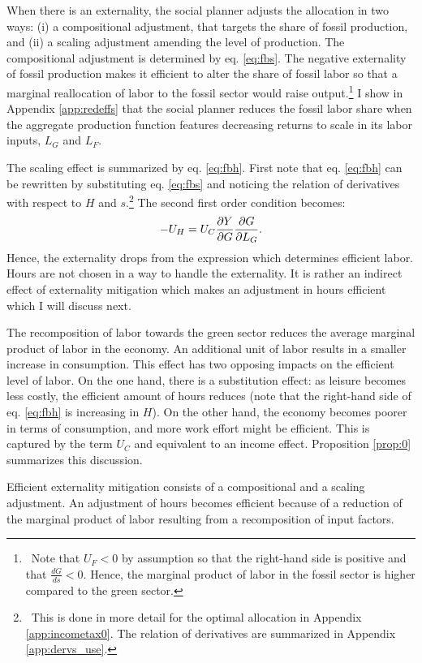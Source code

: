 When there is an externality, the social planner adjusts the allocation in two ways: (i) a compositional adjustment, that targets the share of fossil production, and (ii) a scaling adjustment amending the level of production. 
The compositional adjustment is determined by eq. \eqref{eq:fbs}.
The negative externality of fossil production makes it efficient to alter the share of fossil labor so that  a marginal reallocation of labor to the fossil sector would raise output.\footnote{\ Note that $U_F<0$ by assumption so that the right-hand side is positive and that $\frac{dG}{ds}<0$. Hence, the marginal product of labor in the fossil sector is higher compared to the green sector.} %
I show in Appendix \ref{app:redeffs} that the social planner reduces the fossil labor share when the aggregate production function features decreasing returns to scale in its labor inputs, $L_G$ and $L_F$.


The scaling effect is summarized by eq. \eqref{eq:fbh}.
First note that eq. \eqref{eq:fbh} can be rewritten by substituting eq. \eqref{eq:fbs} and noticing the relation of derivatives with respect to $H$ and $s$.\footnote{\ This is done in more detail for the optimal allocation in Appendix \ref{app:incometax0}. The relation of derivatives are summarized in Appendix \ref{app:dervs_use}.}  
The second first order condition becomes:
\begin{align}\label{eq:fbh_simp}
-U_H=U_C\frac{\partial Y}{\partial G}\frac{\partial{G}}{\partial{L_G}}.
\end{align}
Hence, the externality drops from the expression which determines efficient labor. Hours are not chosen in a way to handle the externality. It is rather an indirect effect of externality mitigation which makes an adjustment in hours efficient which I will discuss next.

The recomposition of labor towards the  green sector reduces the average marginal product of labor in the economy. An additional unit of labor results in a smaller increase in consumption.  This effect has two opposing impacts on the efficient level of labor. On the one hand, there is a substitution effect: as leisure becomes less costly, the efficient amount of hours reduces (note that the right-hand side of eq. \eqref{eq:fbh} is increasing in $H$). On the other hand, the economy becomes poorer in terms of consumption, and more work effort might be efficient. This is captured by the term $U_C$ and equivalent to an income effect. 
Proposition \ref{prop:0} summarizes this discussion.
\begin{prop}\label{prop:0}
	Efficient externality mitigation consists of a compositional and a scaling adjustment. An adjustment of hours becomes efficient because of a reduction of the marginal product of labor resulting from a recomposition of input factors.
\end{prop}


